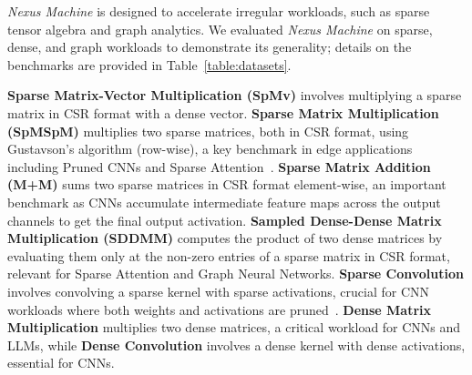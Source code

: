 \textit{Nexus Machine} is designed to accelerate irregular workloads, such as sparse tensor algebra and graph analytics. We evaluated \textit{Nexus Machine} on sparse, dense, and graph workloads to demonstrate its generality; details on the benchmarks are provided in Table~\ref{table:datasets}.

\textbf{Sparse Matrix-Vector Multiplication (SpMv)} involves multiplying a sparse matrix in CSR format with a dense vector. \textbf{Sparse Matrix Multiplication (SpMSpM)} multiplies two sparse matrices, both in CSR format, using Gustavson's algorithm (row-wise), a key benchmark in edge applications including Pruned CNNs and Sparse Attention~\cite{sanger, vitcod}. \textbf{Sparse Matrix Addition (M+M)} sums two sparse matrices in CSR format element-wise, an important benchmark as CNNs accumulate intermediate feature maps across the output channels to get the final output activation.
\textbf{Sampled Dense-Dense Matrix Multiplication (SDDMM)} computes the product of two dense matrices by evaluating them only at the non-zero entries of a sparse matrix in CSR format, relevant for Sparse Attention and Graph Neural Networks.
\textbf{Sparse Convolution} involves convolving a sparse kernel with sparse activations, crucial for CNN workloads where both weights and activations are pruned~\cite{activation_sparsity}.
\textbf{Dense Matrix Multiplication} multiplies two dense matrices, a critical workload for CNNs and LLMs, while \textbf{Dense Convolution} involves a dense kernel with dense activations, essential for CNNs.

